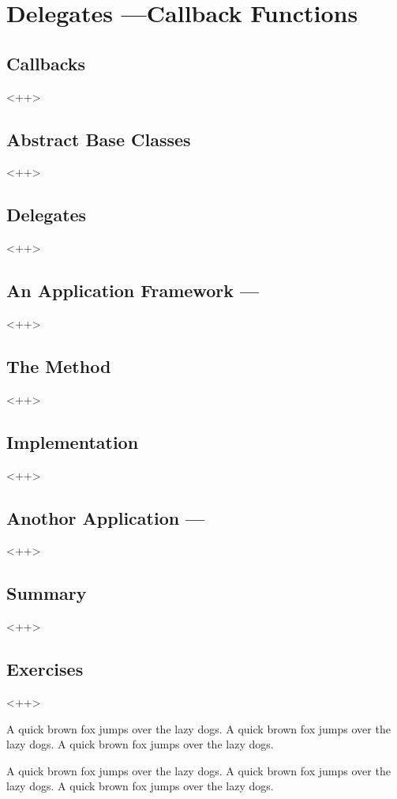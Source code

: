

\chapter{Delegates ---Callback Functions}

\section{Callbacks}<++>

\section{Abstract Base Classes}<++>

\section{Delegates}<++>

\section{An Application Framework ---}<++>

\section{The  Method}<++>

\section{Implementation}<++>

\section{Anothor Application ---}<++>

\section{Summary}<++>

\section{Exercises}<++>

A quick brown fox jumps over the lazy dogs.
A quick brown fox jumps over the lazy dogs.
A quick brown fox jumps over the lazy dogs.

A quick brown fox jumps over the lazy dogs.
A quick brown fox jumps over the lazy dogs.
A quick brown fox jumps over the lazy dogs.


